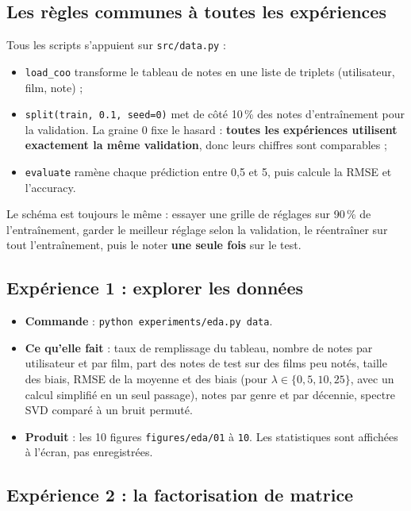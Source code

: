 \documentclass[11pt,a4paper]{article}
\begin{document}
\subsection{Les règles communes à toutes les expériences}

Tous les scripts s'appuient sur \texttt{src/data.py} :
\begin{itemize}
  \item \texttt{load\_coo} transforme le tableau de notes en une liste de triplets
        (utilisateur, film, note) ;
  \item \texttt{split(train, 0.1, seed=0)} met de côté 10\,\% des notes d'entraînement
        pour la validation. La graine 0 fixe le hasard : \textbf{toutes les expériences
        utilisent exactement la même validation}, donc leurs chiffres sont comparables ;
  \item \texttt{evaluate} ramène chaque prédiction entre 0,5 et 5, puis calcule la RMSE
        et l'accuracy.
\end{itemize}
Le schéma est toujours le même : essayer une grille de réglages sur 90\,\% de
l'entraînement, garder le meilleur réglage selon la validation, le réentraîner sur tout
l'entraînement, puis le noter \textbf{une seule fois} sur le test.

\subsection{Expérience 1 : explorer les données}

\begin{itemize}
  \item \textbf{Commande} : \texttt{python experiments/eda.py data}.
  \item \textbf{Ce qu'elle fait} : taux de remplissage du tableau, nombre de notes par
        utilisateur et par film, part des notes de test sur des films peu notés, taille
        des biais, RMSE de la moyenne et des biais (pour $\lambda \in \{0, 5, 10, 25\}$,
        avec un calcul simplifié en un seul passage), notes par genre et par décennie,
        spectre SVD comparé à un bruit permuté.
  \item \textbf{Produit} : les 10 figures \texttt{figures/eda/01} à \texttt{10}. Les
        statistiques sont affichées à l'écran, pas enregistrées.
\end{itemize}

\subsection{Expérience 2 : la factorisation de matrice}
\end{document}
